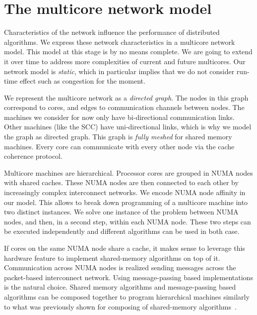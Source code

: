 \documentclass{article}
\begin{document}
\section{The multicore network model}
\label{sec:model}

Characteristics of the network influence the performance of
distributed algorithms. 
We express these network characteristics in a multicore network
model. This model at this stage is by no means complete. We are going to
extend it over time to address more complexities of current and future
multicores.
Our network model is \emph{static}, which in particular implies that
we do not consider run-time effect such as congestion for the moment.

We represent the multicore network as a \emph{directed graph}. The nodes in
this graph correspond to cores, and edges to communication channels
between nodes. The machines we consider for now only have
bi-directional communication links. Other machines (like the SCC) have
uni-directional links, which is why we model the graph as directed
graph.
This graph is \emph{fully meshed} for shared memory machines. Every core can
communicate with every other node via the cache coherence protocol.

Multicore machines are hierarchical. Processor cores are grouped in
NUMA nodes with shared caches. These NUMA nodes are then connected to
each other by increasingly complex interconnect networks. 
We encode NUMA node affinity in our model. This allows to break down
programming of a multicore machine into two distinct instances. We
solve one instance of the problem between NUMA nodes, and then, in a
second step, within each NUMA node. These two steps can be executed
independently and different algorithms can be used in both case.

If cores on the same NUMA node share a cache, it makes sense to
leverage this hardware feature to implement shared-memory algorithms
on top of it. %
Communication across NUMA nodes is realized sending messages across
the packet-based interconnect network. Using message-passing based
implementations is the natural choice. %
Shared memory algorithms and message-passing based algorithms can be
composed together to program hierarchical machines similarly to what
was previously shown for composing of shared-memory
algorithms~\cite{Alistarh2012}.
\end{document}
